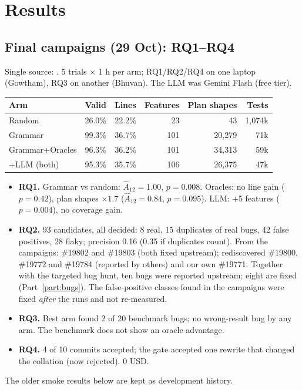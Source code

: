 \section{Results}
\label{part:results}

\subsection{Final campaigns (29 Oct): RQ1--RQ4}
Single source: . 5 trials $\times$ 1 h per arm;
RQ1/RQ2/RQ4 on one laptop (Gowtham), RQ3 on another (Bhuvan). The LLM was Gemini Flash (free tier).
\begin{tabular}{@{}lrrrrr@{}}
\toprule
Arm & Valid & Lines & Features & Plan shapes & Tests \\
\midrule
Random & 26.0\% & 22.2\% & 23 & 43 & 1{,}074k \\
Grammar & 99.3\% & 36.7\% & 101 & 20{,}279 & 71k \\
Grammar+Oracles & 96.3\% & 36.2\% & 101 & 34{,}313 & 59k \\
+LLM (both) & 95.3\% & 35.7\% & 106 & 26{,}375 & 47k \\
\bottomrule
\end{tabular}

\begin{itemize}
  \item \textbf{RQ1.} Grammar vs random: $\hat A_{12}=1.00$, $p=0.008$. Oracles: no
    line gain ($p=0.42$), plan shapes $\times1.7$ ($\hat A_{12}=0.84$, $p=0.095$).
    LLM: +5 features ($p=0.004$), no coverage gain.
  \item \textbf{RQ2.} 93 candidates, all decided: 8 real, 15 duplicates of real
    bugs, 42 false positives, 28 flaky; precision 0.16 (0.35 if duplicates
    count). From the campaigns: \#19802 and \#19803 (both fixed
    upstream); rediscovered \#19800, \#19772 and \#19784 (reported by others) and our own \#19771. Together with
    the targeted bug hunt, ten bugs were reported upstream; eight are fixed
    (Part~\ref{part:bugs}). The false-positive classes found in the campaigns
    were fixed \emph{after} the runs and not re-measured.
  \item \textbf{RQ3.} Best arm found 2 of 20 benchmark bugs; no wrong-result bug
    by any arm. The benchmark does not show an oracle advantage.
  \item \textbf{RQ4.} 4 of 10 commits accepted; the gate accepted one rewrite
    that changed the collation (now rejected). 0 USD.
\end{itemize}
The older smoke results below are kept as development history.

